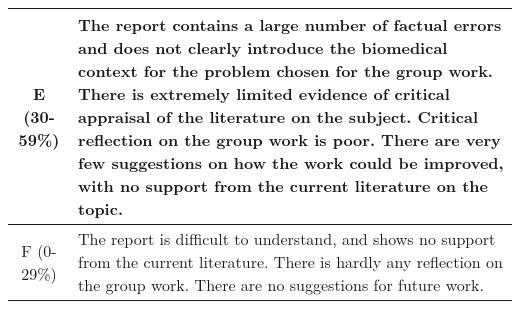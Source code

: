 \documentclass[10pt,a4paper,english]{report}
\begin{document}
\begin{tabularx}{\textwidth}{|c|X|}
\hline 
E (30-59\%)& The report contains a large number of factual errors and does not clearly introduce the biomedical context for the problem chosen for the group work. There is extremely limited evidence of critical appraisal of the literature on the subject. Critical reflection on the group work is poor. There are very few suggestions on how the work could be improved, with no support from the current literature on the topic. \\ 
\hline 
F (0-29\%) & The report is difficult to understand, and shows no support from the current literature. There is hardly any reflection on the group work. There are no suggestions for future work.\\
\hline 
\end{tabularx} 
\end{document}
